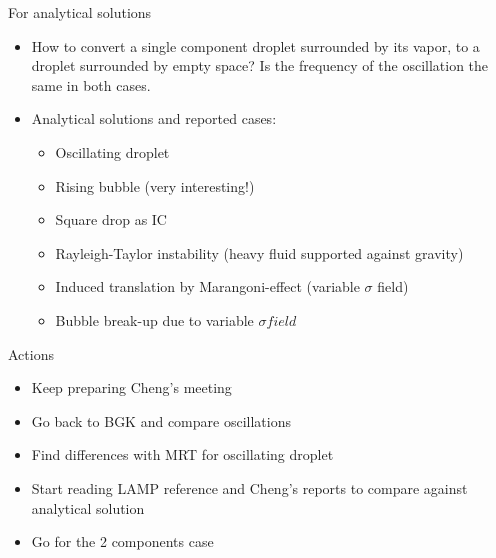 \documentclass[8pt]{beamer}
\begin{document}
	\begin{frame}{For analytical solutions}
		\begin{itemize}
			\item How to convert a single component droplet surrounded by its vapor, to a droplet surrounded by empty space? Is the frequency of the oscillation the same in both cases.
			
			\item Analytical solutions and reported cases:
			\begin{itemize}
				\item Oscillating droplet
				\item Rising bubble (very interesting!)
				\item Square drop as IC
				\item Rayleigh-Taylor instability (heavy fluid supported against gravity)
				\item Induced translation by Marangoni-effect (variable $\sigma$ field)
				\item Bubble break-up due to variable $\sigma field$
			\end{itemize}
		\end{itemize}
	\end{frame}

	\begin{frame}{Actions}
		\begin{itemize}
			\item Keep preparing Cheng's meeting
			\item Go back to BGK and compare oscillations
			\item Find differences with MRT for oscillating droplet
			\item Start reading LAMP reference and Cheng's reports to compare against analytical solution
			\item Go for the 2 components case
		\end{itemize}
	\end{frame}
	
	
	
	
\end{document}
